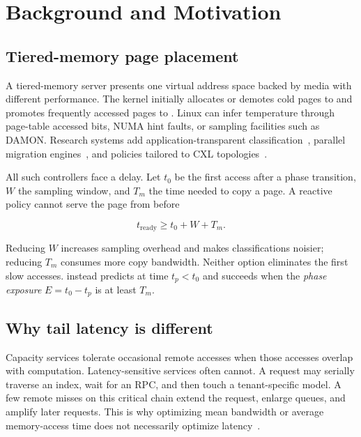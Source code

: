 \section{Background and Motivation}
\label{sec:background}

\subsection{Tiered-memory page placement}

A tiered-memory server presents one virtual address space backed by media with
different performance.  The kernel initially allocates or demotes cold pages
to \slow and promotes frequently accessed pages to \fast.  Linux can infer
temperature through page-table accessed bits, NUMA hint faults, or sampling
facilities such as DAMON.  Research systems add application-transparent
classification~\cite{agarwal2017thermostat}, parallel migration
engines~\cite{yan2019nimble}, and policies tailored to CXL
topologies~\cite{maruf2023tpp}.

All such controllers face a delay.  Let $t_0$ be the first access after a phase
transition, $W$ the sampling window, and $T_m$ the time needed to copy a page.
A reactive policy cannot serve the page from \fast before

\begin{equation}
  t_{\mathrm{ready}} \ge t_0 + W + T_m.
  \label{eq:reactive-delay}
\end{equation}

Reducing $W$ increases sampling overhead and makes classifications noisier;
reducing $T_m$ consumes more copy bandwidth.  Neither option eliminates the
first slow accesses.  \system instead predicts at time $t_p < t_0$ and succeeds
when the \emph{phase exposure} $E=t_0-t_p$ is at least $T_m$.

\subsection{Why tail latency is different}

Capacity services tolerate occasional remote accesses when those accesses
overlap with computation.  Latency-sensitive services often cannot.  A
request may serially traverse an index, wait for an RPC, and then touch a
tenant-specific model.  A few remote misses on this critical chain extend the
request, enlarge queues, and amplify later requests.  This is why optimizing
mean bandwidth or average memory-access time does not necessarily optimize
\ptail latency~\cite{dean2013tail}.

